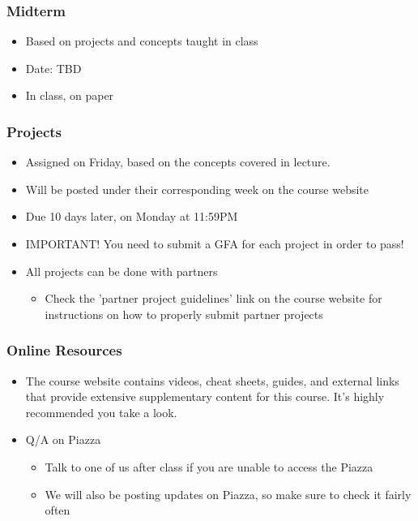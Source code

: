 \documentclass{beamer}
\begin{document}
            \begin{frame}
                \frametitle{Midterm}
                    \begin{itemize}
                        \item Based on projects and concepts taught in class
                        \item Date: TBD
                        \item In class, on paper
                    \end{itemize}
            \end{frame}
            
            \begin{frame}
                \frametitle{Projects}
                    \begin{itemize}
                        \item Assigned on Friday, based on the concepts covered in lecture.
                        \item Will be posted under their corresponding week on the course website
                        \item Due 10 days later, on Monday at 11:59PM
                        \item IMPORTANT! You need to submit a GFA for each project in order to pass!
                        \item All projects can be done with partners
                        \begin{itemize}
                            \item Check the 'partner project guidelines' link on the course website for instructions on how to properly submit partner projects
                        \end{itemize}
                        
                    \end{itemize}
            \end{frame}
            
            \begin{frame}
                \frametitle{Online Resources}
                    \begin{itemize}
                        \item The course website contains videos, cheat sheets, guides, and external links that provide extensive supplementary content for this course. It's highly recommended you take a look.
                        \item Q/A on Piazza
                            \begin{itemize}
                                \item Talk to one of us after class if you are unable to access the Piazza
                                \item We will also be posting updates on Piazza, so make sure to check it fairly often
                            \end{itemize}
                    \end{itemize}
            \end{frame}
            
\end{document}
